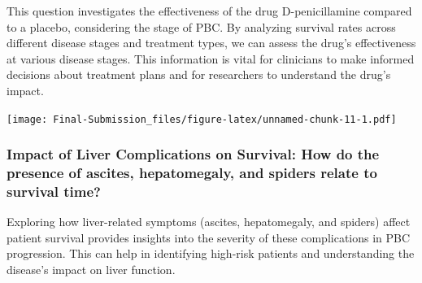 \documentclass[
]{article}
\newenvironment{Shaded}{\begin{snugshade}}{\end{snugshade}}
\newcommand{\AttributeTok}[1]{\textcolor[rgb]{0.13,0.29,0.53}{#1}}
\newcommand{\CommentTok}[1]{\textcolor[rgb]{0.56,0.35,0.01}{\textit{#1}}}
\newcommand{\ConstantTok}[1]{\textcolor[rgb]{0.56,0.35,0.01}{#1}}
\newcommand{\FunctionTok}[1]{\textcolor[rgb]{0.13,0.29,0.53}{\textbf{#1}}}
\newcommand{\NormalTok}[1]{#1}
\newcommand{\OtherTok}[1]{\textcolor[rgb]{0.56,0.35,0.01}{#1}}
\newcommand{\SpecialCharTok}[1]{\textcolor[rgb]{0.81,0.36,0.00}{\textbf{#1}}}
\newcommand{\StringTok}[1]{\textcolor[rgb]{0.31,0.60,0.02}{#1}}
\begin{document}
This question investigates the effectiveness of the drug D-penicillamine
compared to a placebo, considering the stage of PBC. By analyzing
survival rates across different disease stages and treatment types, we
can assess the drug's effectiveness at various disease stages. This
information is vital for clinicians to make informed decisions about
treatment plans and for researchers to understand the drug's impact.

\begin{Shaded}
\end{Shaded}

\texttt{[image: Final-Submission\_files/figure-latex/unnamed-chunk-11-1.pdf]}

\hypertarget{impact-of-liver-complications-on-survival-how-do-the-presence-of-ascites-hepatomegaly-and-spiders-relate-to-survival-time}{%
\subsubsection{Impact of Liver Complications on Survival: How do the
presence of ascites, hepatomegaly, and spiders relate to survival
time?}\label{impact-of-liver-complications-on-survival-how-do-the-presence-of-ascites-hepatomegaly-and-spiders-relate-to-survival-time}}

Exploring how liver-related symptoms (ascites, hepatomegaly, and
spiders) affect patient survival provides insights into the severity of
these complications in PBC progression. This can help in identifying
high-risk patients and understanding the disease's impact on liver
function.
\end{document}
